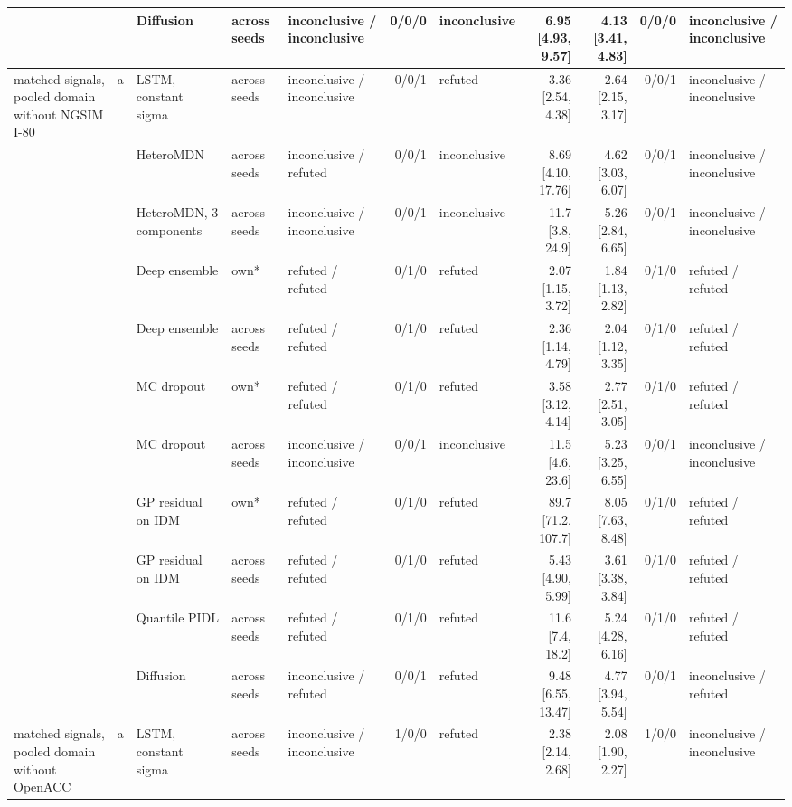 \begin{longtable}{lllllrlrrrl}
 &  & Diffusion & across seeds & inconclusive / inconclusive & 0/0/0 & inconclusive & 6.95 [4.93, 9.57] & 4.13 [3.41, 4.83] & 0/0/0 & inconclusive / inconclusive \\
\midrule
matched signals, pooled domain without NGSIM I-80 & a & LSTM, constant sigma & across seeds & inconclusive / inconclusive & 0/0/1 & refuted & 3.36 [2.54, 4.38] & 2.64 [2.15, 3.17] & 0/0/1 & inconclusive / inconclusive \\
 &  & HeteroMDN & across seeds & inconclusive / refuted & 0/0/1 & inconclusive & 8.69 [4.10, 17.76] & 4.62 [3.03, 6.07] & 0/0/1 & inconclusive / inconclusive \\
 &  & HeteroMDN, 3 components & across seeds & inconclusive / inconclusive & 0/0/1 & inconclusive & 11.7 [3.8, 24.9] & 5.26 [2.84, 6.65] & 0/0/1 & inconclusive / inconclusive \\
 &  & Deep ensemble & own* & refuted / refuted & 0/1/0 & refuted & 2.07 [1.15, 3.72] & 1.84 [1.13, 2.82] & 0/1/0 & refuted / refuted \\
 &  & Deep ensemble & across seeds & refuted / refuted & 0/1/0 & refuted & 2.36 [1.14, 4.79] & 2.04 [1.12, 3.35] & 0/1/0 & refuted / refuted \\
 &  & MC dropout & own* & refuted / refuted & 0/1/0 & refuted & 3.58 [3.12, 4.14] & 2.77 [2.51, 3.05] & 0/1/0 & refuted / refuted \\
 &  & MC dropout & across seeds & inconclusive / inconclusive & 0/0/1 & inconclusive & 11.5 [4.6, 23.6] & 5.23 [3.25, 6.55] & 0/0/1 & inconclusive / inconclusive \\
 &  & GP residual on IDM & own* & refuted / refuted & 0/1/0 & refuted & 89.7 [71.2, 107.7] & 8.05 [7.63, 8.48] & 0/1/0 & refuted / refuted \\
 &  & GP residual on IDM & across seeds & refuted / refuted & 0/1/0 & refuted & 5.43 [4.90, 5.99] & 3.61 [3.38, 3.84] & 0/1/0 & refuted / refuted \\
 &  & Quantile PIDL & across seeds & refuted / refuted & 0/1/0 & refuted & 11.6 [7.4, 18.2] & 5.24 [4.28, 6.16] & 0/1/0 & refuted / refuted \\
 &  & Diffusion & across seeds & inconclusive / refuted & 0/0/1 & refuted & 9.48 [6.55, 13.47] & 4.77 [3.94, 5.54] & 0/0/1 & inconclusive / refuted \\
\midrule
matched signals, pooled domain without OpenACC & a & LSTM, constant sigma & across seeds & inconclusive / inconclusive & 1/0/0 & refuted & 2.38 [2.14, 2.68] & 2.08 [1.90, 2.27] & 1/0/0 & inconclusive / inconclusive \\

\end{longtable}
